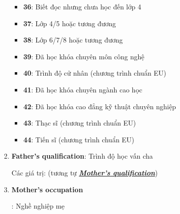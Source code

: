 \begin{itemize}
\begin{enumerate}
\begin{itemize}
              \item \textbf{36}: Biết đọc nhưng chưa học đến lớp 4
              \item \textbf{37}: Lớp 4/5 hoặc tương đương
              \item \textbf{38}: Lớp 6/7/8 hoặc tương đương
              \item \textbf{39}: Đã học khóa chuyên môn công nghệ
              \item \textbf{40}: Trình độ cử nhân (chương trình chuẩn EU)
              \item \textbf{41}: Đã học khóa chuyên ngành cao học
              \item \textbf{42}: Đã học khóa cao đẳng kỹ thuật chuyên nghiệp
              \item \textbf{43}: Thạc sĩ (chương trình chuẩn EU)
              \item \textbf{44}: Tiến sĩ (chương trình chuẩn EU)
            \end{itemize}

            \item \textbf{Father's qualification}: Trình độ học vấn cha
            
            Các giá trị: (tương tự \hyperlink{line:1-mom-qua}{\textit{\textbf{Mother's qualification}}})

            \item \hypertarget{line:1-mom-job}{\textbf{Mother's occupation}}: Nghề nghiệp mẹ


\end{enumerate}
\end{itemize}

